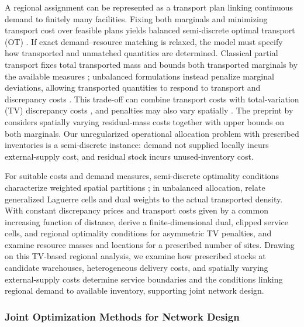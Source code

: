 \documentclass[a4paper,fleqn]{cas-sc}
\theoremstyle{remark}
\theoremstyle{plain}
\begin{document}
A regional assignment can be represented as a transport plan linking continuous demand to finitely many facilities. Fixing both marginals and minimizing transport cost over feasible plans yields balanced semi-discrete optimal transport (OT) \citep{peyre2019computational}. If exact demand--resource matching is relaxed, the model must specify how transported and unmatched quantities are determined. Classical partial transport fixes total transported mass and bounds both transported marginals by the available measures \citep{figalli2010partial}; unbalanced formulations instead penalize marginal deviations, allowing transported quantities to respond to transport and discrepancy costs \citep{liero2018optimal}. This trade-off can combine transport costs with total-variation (TV) discrepancy costs \citep{piccoli2014generalized}, and penalties may also vary spatially \citep{sejourne2023unbalanced}. The preprint by \citet{bai2024generalizedpartial} considers spatially varying residual-mass costs together with upper bounds on both marginals. Our unregularized operational allocation problem with prescribed inventories is a semi-discrete instance: demand not supplied locally incurs external-supply cost, and residual stock incurs unused-inventory cost.

For suitable costs and demand measures, semi-discrete optimality conditions characterize weighted spatial partitions \citep{hartmann2020semidiscrete}; in unbalanced allocation, \citet{bourne2018semi} relate generalized Laguerre cells and dual weights to the actual transported density. With constant discrepancy prices and transport costs given by a common increasing function of distance, \citet{chungunbalanced} derive a finite-dimensional dual, clipped service cells, and regional optimality conditions for asymmetric TV penalties, and examine resource masses and locations for a prescribed number of sites. Drawing on this TV-based regional analysis, we examine how prescribed stocks at candidate warehouses, heterogeneous delivery costs, and spatially varying external-supply costs determine service boundaries and the conditions linking regional demand to available inventory, supporting joint network design.

\subsubsection{Joint Optimization Methods for Network Design}\label{subsec:lit_transport}
\end{document}
